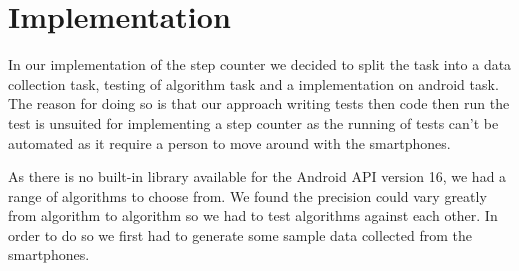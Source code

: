 \section{Implementation}
In our implementation of the step counter we decided to split the task into a data collection task, testing of algorithm task and a implementation on android task. The reason for doing so is that our approach writing tests then code then run the test is unsuited for implementing a step counter as the running of tests can't be automated as it require a person to move around with the smartphones.

As there is no built-in library available for the Android API version 16, we had a range of algorithms to choose from. We found the precision could vary greatly from algorithm to algorithm so we had to test algorithms against each other. In order to do so we first had to generate some sample data collected from the smartphones.
